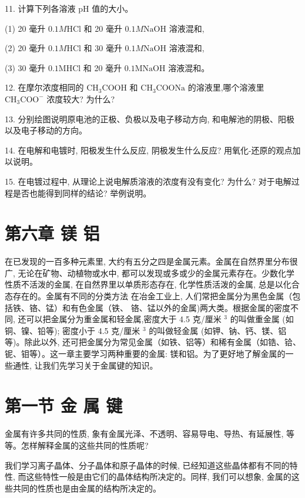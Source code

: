 \documentclass[10pt]{article}
\begin{document}
11. 计算下列各溶液 \(\mathrm{{pH}}\) 值的大小。

(1) 20 毫升 \({0.1M}\mathrm{{HCl}}\) 和 20 毫升 \({0.1M}\mathrm{{NaOH}}\) 溶液混和,

(2) 20 毫升 \({0.1M}\mathrm{{HCl}}\) 和 30 毫升 \({0.1M}\mathrm{{NaOH}}\) 溶液混和,

(3) 30 毫升 \({0.1}\mathrm{{MHCl}}\) 和 20 毫升 \({0.1}\mathrm{{MNaOH}}\) 溶液混和。

12. 在摩尔浓度相同的 \({\mathrm{{CH}}}_{3}\mathrm{{COOH}}\) 和 \({\mathrm{{CH}}}_{3}\mathrm{{COONa}}\) 的溶液里,哪个溶液里 \({\mathrm{{CH}}}_{3}{\mathrm{{COO}}}^{ - }\) 浓度较大? 为什么?

13. 分别绘图说明原电池的正极、负极以及电子移动方向, 和电解池的阴极、阳极以及电子移动的方向。

14. 在电解和电镀时, 阳极发生什么反应, 阴极发生什么反应? 用氧化-还原的观点加以说明。

15. 在电镀过程中, 从理论上说电解质溶液的浓度有没有变化? 为什么? 对于电解过程是否也能得到同样的结论? 举例说明。

\section*{第六章 镁 铝}

在已发现的一百多种元素里, 大约有五分之四是金属元素。金属在自然界里分布很广, 无论在矿物、动植物或水中, 都可以发现或多或少的金属元素存在。少数化学性质不活泼的金属, 在自然界里以单质形态存在, 化学性质活泼的金属, 总是以化合态存在的。金属有不同的分类方法 在冶金工业上, 人们常把金属分为黑色金属（包括铁、铬、锰）和有色金属（铁、 铬、锰以外的金属)两大类。根据金属的密度不同, 还可以把金属分为重金属和轻金属,密度大于 4.5 克/厘米 \({}^{3}\) 的叫做重金属 (如铜、镍、铅等); 密度小于 4.5 克/厘米 \({}^{3}\) 的叫做轻金属 (如钾、钠、钙、镁、铝等)。除此以外, 还可把金属分为常见金属（如铁、铝等）和稀有金属（如锆、铪、铌、钼等）。这一章主要学习两种重要的金属: 镁和铝。为了更好地了解金属的一些通性, 让我们先学习关于金属键的知识。

\section*{第一节 金 属 键}

金属有许多共同的性质, 象有金属光泽、不透明、容易导电、导热、有延展性, 等等。怎样解释金属的这些共同的性质呢?

我们学习离子晶体、分子晶体和原子晶体的时候, 已经知道这些晶体都有不同的特性, 而这些特性一般是由它们的晶体结构所决定的。同样, 我们可以想象, 金属的这些共同的性质也是由金属的结构所决定的。
\end{document}
